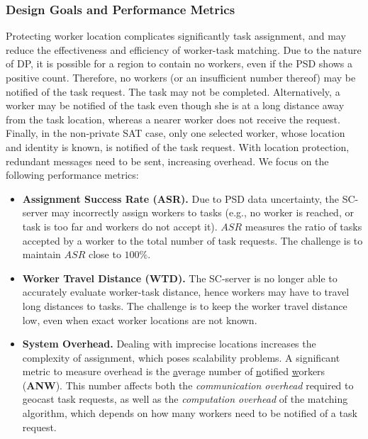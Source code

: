 \documentclass{USC-Thesis}
\renewcommand\bf\bfseries  %
\numberwithin{equation}{chapter}
\begin{document}
\subsubsection{Design Goals and Performance Metrics}
\label{sec:metrics1}
Protecting worker location complicates significantly task assignment, and may reduce the effectiveness and efficiency of worker-task matching. Due to the nature of DP, it is possible for a region to contain no workers, even if the PSD shows a positive count. Therefore, no workers (or an insufficient number thereof) may be notified of the task request. The task may not be completed. Alternatively, a worker may be notified of the task even though she is at a long distance away from the task location, whereas a nearer worker does not receive the request. 
Finally, in the non-private SAT case, only one selected worker, whose location and identity is known, is notified of the task request. 
With location protection, redundant messages need to be sent, increasing overhead.
We focus on the following performance metrics:
\begin{itemize}
\item
{\bf Assignment Success Rate (ASR).} Due to PSD data uncertainty, the SC-server may incorrectly assign workers to tasks (e.g., no worker is reached, or task is too far and workers do not accept it). $\mathit{ASR}$ measures the ratio of tasks accepted by a worker
to the total number of task requests. The challenge is to maintain $\mathit{ASR}$ close to $100\%$.
\item
{\bf Worker Travel Distance (WTD).} The SC-server is no longer able to accurately evaluate worker-task distance, hence workers may have to travel long distances to tasks. The challenge is to keep the worker travel distance low, even when exact worker locations are not known.
\item
{\bf System Overhead.} Dealing with imprecise locations increases the complexity of assignment, which poses scalability problems. 
A significant metric to measure overhead is the {\underline a}verage number of {\underline n}otified {\underline w}orkers ({\bf ANW}).
This number affects both the {\em communication overhead} required to geocast task requests, as well as the {\em computation overhead} of the matching algorithm, which depends on how many workers need to be notified of a task request.
\end{itemize}
\end{document}
